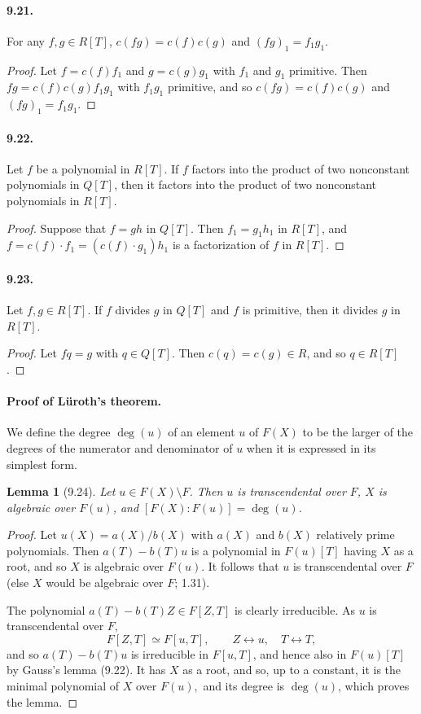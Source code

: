 \documentclass[UTF8,11pt]{ctexart}
\newtheorem*{lemma}{Lemma}
\theoremstyle{definition}
\begin{document}
\paragraph{9.21.} For any $f,g\in R[T]$, $c(fg)=c(f)c(g)$ and $(fg)_1=f_1g_1$.
\begin{proof}
Let $f=c(f)f_1$ and $g=c(g)g_1$ with $f_1$ and $g_1$ primitive. Then $fg=c(f)c(g)f_1g_1$ with $f_1g_1$ primitive, and so $c(fg)=c(f)c(g)$ and $(fg)_1=f_1g_1$.
\end{proof}
\paragraph{9.22.} Let $f$ be a polynomial in $R[T]$. If $f$ factors into the product of two nonconstant polynomials in $Q[T]$, then it factors into the product of two nonconstant polynomials in $R[T]$.
\begin{proof}
Suppose that $f=gh$ in $Q[T]$. Then $f_1=g_1h_1$ in $R[T]$, and $f=c(f)\cdot f_1=(c(f)\cdot g_1)h_1$ is a factorization of $f$ in $R[T]$.
\end{proof}
\paragraph{9.23.} Let $f,g\in R[T]$. If $f$ divides $g$ in $Q[T]$ and $f$ is primitive, then it divides $g$ in $R[T]$.
\begin{proof}
Let $fq=g$ with $q\in Q[T]$. Then $c(q)=c(g)\in R$, and so $q\in R[T]$.
\end{proof}

\paragraph{Proof of L\"uroth's theorem.}
We define the degree $\deg(u)$ of an element $u$ of $F(X)$ to be the larger of the degrees of the numerator and denominator of $u$ when it is expressed in its simplest form.
\begin{lemma}[9.24]
Let $u\in F(X)\setminus F$. Then $u$ is transcendental over $F$, $X$ is algebraic over $F(u)$, and $[F(X):F(u)]=\deg(u)$.
\end{lemma}
\begin{proof}
Let $u(X)=a(X)/b(X)$ with $a(X)$ and $b(X)$ relatively prime polynomials. Then $a(T)-b(T)u$ is a polynomial in $F(u)[T]$ having $X$ as a root, and so $X$ is algebraic over $F(u)$. It follows that $u$ is transcendental over $F$ (else $X$ would be algebraic over $F$; 1.31).

The polynomial $a(T)-b(T)Z\in F[Z,T]$ is clearly irreducible. As $u$ is transcendental over $F$,
\[
F[Z,T]\simeq F[u,T],\qquad Z\leftrightarrow u,\quad T\leftrightarrow T,
\]
and so $a(T)-b(T)u$ is irreducible in $F[u,T]$, and hence also in $F(u)[T]$ by Gauss's lemma (9.22). It has $X$ as a root, and so, up to a constant, it is the minimal polynomial of $X$ over $F(u),$ and its degree is $\deg(u)$, which proves the lemma.
\end{proof}
\end{document}
